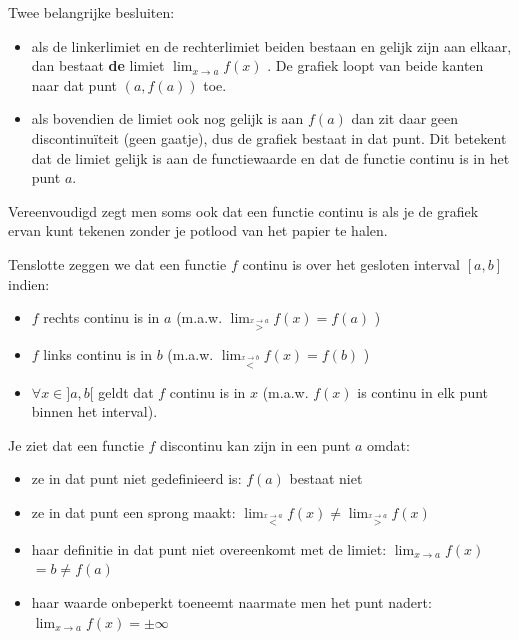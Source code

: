 \begin{ftonthoud}
	Twee belangrijke besluiten:
\begin{itemize}
\item als de linkerlimiet en de rechterlimiet beiden bestaan en gelijk zijn
aan elkaar, dan bestaat \textbf{de} limiet $\lim_{x\to a}f(x)$
. De grafiek loopt van beide kanten naar dat punt $(a,f(a))$ toe.
\item als bovendien de limiet ook nog gelijk is aan $f(a)$ dan zit daar
geen discontinu\"iteit (geen gaatje), dus de grafiek bestaat in dat
punt. Dit betekent dat de limiet gelijk is aan de functiewaarde en
dat de functie continu is in het punt $a$.
\end{itemize}
Vereenvoudigd zegt men soms ook dat een functie continu
is als je de grafiek ervan kunt tekenen zonder je potlood van het
papier te halen.
\end{ftonthoud}


Tenslotte zeggen we dat een functie $f$ continu is over
het gesloten interval $[a,b]$ indien:
\begin{itemize}
\item $f$ rechts continu is in $a$ (m.a.w. $\lim_{\overset{x\rightarrow a}{>}}f(x)=f(a)$
)
\item $f$ links continu is in $b$ (m.a.w. $\lim_{\overset{x\rightarrow b}{<}}f(x)=f(b)$
)
\item $\forall x\in]a,b[$ geldt dat $f$ continu is in $x$ (m.a.w. $f(x)$
is continu in elk punt binnen het interval).
\end{itemize}



Je ziet dat een functie $f$ discontinu kan zijn in een
punt $a$ omdat:
\begin{itemize}
\item ze in dat punt niet gedefinieerd is: $f(a)$ bestaat niet
\item ze in dat punt een sprong maakt: $\lim_{\overset{x\rightarrow a}{<}}f(x)$$\neq\lim_{\overset{x\rightarrow a}{>}}f(x)$
\item haar definitie in dat punt niet overeenkomt met de limiet: $\lim_{x\to a}f(x)$$=b\neq f(a)$ 
\item haar waarde onbeperkt toeneemt naarmate men het punt nadert: $\lim_{x\to a}f(x)$$=\pm\infty$ 
\end{itemize}

